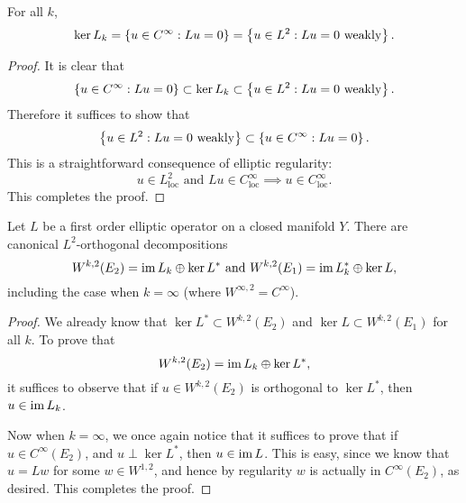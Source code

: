 \documentclass{amsart}
\begin{document}
 \begin{prop}
   For all $k$,
   \begin{equation*}
     \ker L_{k}=\left\{u\in C^{\infty}:Lu=0\right\}=\left\{u\in L^{2}:Lu=0\text{ weakly}\right\}.
   \end{equation*}
 \end{prop}
 \begin{proof}
   It is clear that
   \begin{equation*}
     \left\{u\in C^{\infty}:Lu=0\right\}\subset \ker L_{k}\subset \left\{u\in L^{2}:Lu=0\text{ weakly}\right\}.
   \end{equation*}
   Therefore it suffices to show that
   \begin{equation*}
     \left\{u\in L^{2}:Lu=0\text{ weakly}\right\}\subset \left\{u\in C^{\infty}:Lu=0\right\}.
   \end{equation*}
   This is a straightforward consequence of elliptic regularity:
   \begin{equation*}
     u\in L^{2}_{\text{loc}}\text{ and }Lu\in
     C^{\infty}_{\text{loc}}\implies u\in C^{\infty}_{\text{loc}}.
   \end{equation*}
   This completes the proof.
 \end{proof}
 \begin{cor}
   Let $L$ be a first order elliptic operator on a closed manifold
   $Y$. There are canonical $L^{2}$-orthogonal decompositions
   \begin{equation*}
     W^{k,2}(E_{2})=\operatorname{\mathrm{im}} L_{k}\oplus \ker L^{*}\text{ and
     }W^{k,2}(E_{1})=\operatorname{\mathrm{im}} L^{*}_{k}\oplus \ker L,
   \end{equation*}
   including the case when $k=\infty$ (where $W^{\infty,2}=C^{\infty}$).   
 \end{cor}
 \begin{proof}
   We already know that $\ker L^{*}\subset W^{k,2}(E_{2})$ and $\ker
   L\subset W^{k,2}(E_{1})$ for all $k$. To prove that
   \begin{equation*}
     W^{k,2}(E_{2})=\operatorname{\mathrm{im}} L_{k}\oplus \ker L^{*},
   \end{equation*}
   it suffices to observe that if $u\in W^{k,2}(E_{2})$ is orthogonal
   to $\ker L^{*}$, then $u\in \operatorname{\mathrm{im}} L_{k}$.

   Now when $k=\infty$, we once again notice that it suffices to prove
   that if $u\in C^{\infty}(E_{2})$, and $u\perp \ker L^{*}$, then
   $u\in \operatorname{\mathrm{im}} L$. This is easy, since we know that $u=Lw$ for some
   $w\in W^{1,2}$, and hence by regularity $w$ is actually in
   $C^{\infty}(E_{2})$, as desired. This completes the proof.
 \end{proof}
\end{document}
